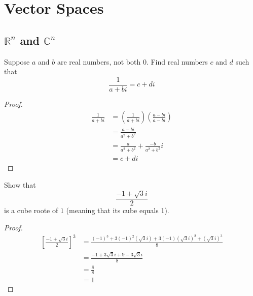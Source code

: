 \chapter{Vector Spaces}

\section{ \label{1.A} \(\mathbb{R}^n\) and \(\mathbb{C}^n\)}

\begin{exercise} \label{1.A.1}
    Suppose \( a \) and \( b \) are real numbers, not both \( 0 \). Find real numbers \( c \) and \( d \) such that
    \[ \frac{1}{a+bi} = c+di \]
    \begin{proof}
        \begin{align*}
            \frac{1}{a+bi} &= \left( \frac{1}{a+bi} \right) \left( \frac{a-bi}{a-bi} \right) \\
            &= \frac{a-bi}{a^2+b^2} \\
            &= \frac{a}{a^2+b^2} + \frac{-b}{a^2+b^2}i \\
            &= c+di
        \end{align*}
    \end{proof}
\end{exercise}

\begin{exercise} \label{1.A.2}
    Show that
    \[ \frac{-1+\sqrt{3}i}{2} \]
    is a cube roote of \( 1 \) (meaning that its cube equals 1).
    
    \begin{proof}
        \begin{align*}
            \left[ \frac{-1+\sqrt{3}i}{2} \right]^3 &= \frac{(-1)^3+3(-1)^2(\sqrt{3}i)+3(-1)(\sqrt{3}i)^2+(\sqrt{3}i)^3}{8} \\
            &= \frac{-1 + 3\sqrt{3}i+9-3\sqrt{3}i}{8} \\
            &= \frac{8}{8} \\
            &= 1
        \end{align*}
    \end{proof}
\end{exercise}

